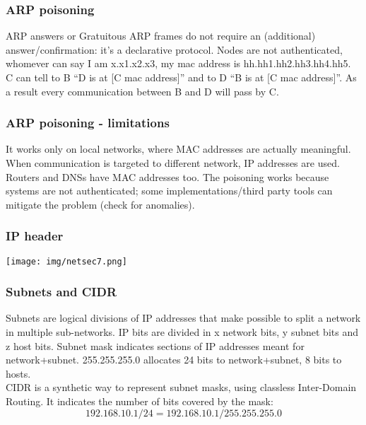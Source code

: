 \documentclass[a4paper, 10pt, titlepage]{article}
\begin{document}
\subsubsection{ARP poisoning}
ARP answers or Gratuitous ARP frames do not require an (additional) answer/confirmation: it’s a declarative protocol. Nodes are not authenticated, whomever can say I am x.x1.x2.x3, my mac address is hh.hh1.hh2.hh3.hh4.hh5.\\
C can tell to B “D is at [C mac address]” and to D “B is at [C mac address]”. As a result every communication between B and D will pass by C.
\subsubsection*{ARP poisoning - limitations}
It works only on local networks, where MAC addresses are actually meaningful. When communication is targeted to different network, IP addresses are used. Routers and DNSs have MAC addresses too. The poisoning works because systems are not authenticated; some implementations/third party tools can mitigate the problem (check for anomalies).

\subsubsection*{IP header}
\begin{center}
	\texttt{[image: img/netsec7.png]}
\end{center}

\subsubsection*{Subnets and CIDR}
Subnets are logical divisions of IP addresses that make possible to split a network in multiple sub-networks. IP bits are divided in x network bits, y subnet bits and z host bits. Subnet mask indicates sections of IP addresses meant for network+subnet. 255.255.255.0 allocates 24 bits to network+subnet, 8 bits to hosts. \\
CIDR is a synthetic way to represent subnet masks, using classless Inter-Domain Routing. It indicates the number of bits covered by the mask:
 $$192.168.10.1/24 = 192.168.10.1/255.255.255.0$$
 
\end{document}
